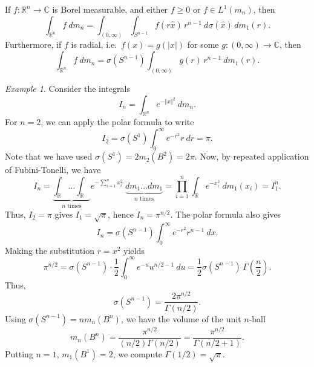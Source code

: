 \documentclass[11pt]{article}
\newcommand{\C}{\mathbb{C}}
\newcommand{\R}{\mathbb{R}}
\newcommand{\norm}[1]{\Vert #1 \Vert}
\theoremstyle{definition}
\theoremstyle{remark}
\newtheorem*{example}{Example}
\numberwithin{equation}{section}
\begin{document}
    \begin{lemma}
        If $f\colon \R^n \to \C$ is Borel measurable, and either $f \geq 0$ or $f\in
        L^1(m_n)$, then \[
            \int_{\R^n} f\:dm_n = \int_{(0, \infty)} \int_{S^{n - 1}} f(r\hat{x})
            \,r^{n - 1}\:d\sigma(\hat{x})\,dm_1(r).
        \] Furthermore, if $f$ is radial, i.e.\ $f(x) = g(|x|)$ for some $g\colon (0,
        \infty) \to \C$, then \[
            \int_{\R^n} f\:dm_n = \sigma(S^{n - 1}) \int_{(0, \infty)} g(r)\,r^{n -
            1}\:dm_1(r).
        \]
    \end{lemma}

    \begin{example}
        Consider the integrals \[
            I_n = \int_{\R^n} e^{-\norm{x}^2}\:dm_n.
        \] For $n = 2$, we can apply the polar formula to write \[
            I_2 = \sigma(S^1)\int_0^\infty e^{-r^2} r\:dr = \pi.
        \] Note that we have used $\sigma(S^1) = 2m_2(B^2) = 2\pi$. Now, by repeated
        application of Fubini-Tonelli, we have \[
            I_n = \underbrace{\int_\R \dots \int_\R}_{n\text{ times}}
            e^{-\sum_{i = 1}^n x_i^2}\:\underbrace{dm_1 \dots dm_1}_{n\text{ times}}
            = \prod_{i = 1}^n \int_\R e^{-x_i^2} \:dm_1(x_i) = I_1^n.
        \] Thus, $I_2 = \pi$ gives $I_1 = \sqrt{\pi}$, hence $I_n = \pi^{n / 2}$. The
        polar formula also gives \[
            I_n = \sigma(S^{n - 1})\int_0^\infty e^{-r^2} r^{n - 1}\:dx.
        \] Making the substitution $r = x^2$ yields \[
            \pi^{n / 2} = \sigma(S^{n - 1}) \cdot \frac{1}{2} \int_0^\infty e^{-u}
            u^{n /2 - 1}\:du = \frac{1}{2} \sigma(S^{n - 1})
            \,\Gamma\left(\frac{n}{2}\right).
        \] Thus, \[
            \sigma(S^{n - 1}) = \frac{2\pi^{n / 2}}{\Gamma(n / 2)}.
        \] Using $\sigma(S^{n - 1}) = nm_n(B^n)$, we have the volume of the unit
        $n$-ball \[
            m_n(B^n) = \frac{\pi^{n / 2}}{(n / 2)\Gamma(n / 2)} = \frac{\pi^{n /
            2}}{\Gamma(n / 2 + 1)}.
        \] Putting $n = 1$, $m_1(B^1) = 2$, we compute $\Gamma(1 / 2) = \sqrt{\pi}$.
    \end{example}
\end{document}
